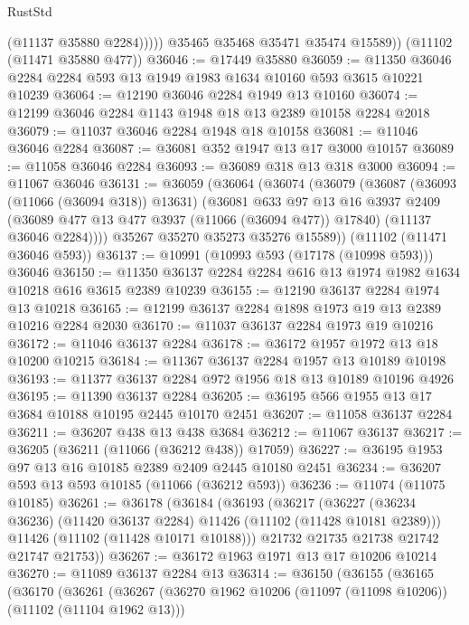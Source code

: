 \begin{lexlean}{RustStd}
\begin{coremodule}
                (@11137 @35880 @2284)))))
        @35465
        @35468
        @35471
        @35474
        @15589))
    (@11102 (@11471 @35880 @477))
@36046 := @17449 @35880
@36059 := @11350 @36046 @2284 @2284 @593 @13 @1949 @1983 @1634 @10160 @593 @3615 @10221 @10239
@36064 := @12190 @36046 @2284 @1949 @13 @10160
@36074 := @12199 @36046 @2284 @1143 @1948 @18 @13 @2389 @10158 @2284 @2018
@36079 := @11037 @36046 @2284 @1948 @18 @10158
@36081 := @11046 @36046 @2284
@36087 := @36081 @352 @1947 @13 @17 @3000 @10157
@36089 := @11058 @36046 @2284
@36093 := @36089 @318 @13 @318 @3000
@36094 := @11067 @36046
@36131 := @36059
    (@36064
      (@36074
        (@36079
          (@36087
            (@36093 (@11066 (@36094 @318)) @13631)
            (@36081
              @633
              @97
              @13
              @16
              @3937
              @2409
              (@36089 @477 @13 @477 @3937 (@11066 (@36094 @477)) @17840)
              (@11137 @36046 @2284))))
        @35267
        @35270
        @35273
        @35276
        @15589))
    (@11102 (@11471 @36046 @593))
@36137 := @10991 (@10993 @593 (@17178 (@10998 @593))) @36046
@36150 := @11350 @36137 @2284 @2284 @616 @13 @1974 @1982 @1634 @10218 @616 @3615 @2389 @10239
@36155 := @12190 @36137 @2284 @1974 @13 @10218
@36165 := @12199 @36137 @2284 @1898 @1973 @19 @13 @2389 @10216 @2284 @2030
@36170 := @11037 @36137 @2284 @1973 @19 @10216
@36172 := @11046 @36137 @2284
@36178 := @36172 @1957 @1972 @13 @18 @10200 @10215
@36184 := @11367 @36137 @2284 @1957 @13 @10189 @10198
@36193 := @11377 @36137 @2284 @972 @1956 @18 @13 @10189 @10196 @4926
@36195 := @11390 @36137 @2284
@36205 := @36195 @566 @1955 @13 @17 @3684 @10188 @10195 @2445 @10170 @2451
@36207 := @11058 @36137 @2284
@36211 := @36207 @438 @13 @438 @3684
@36212 := @11067 @36137
@36217 := @36205 (@36211 (@11066 (@36212 @438)) @17059)
@36227 := @36195 @1953 @97 @13 @16 @10185 @2389 @2409 @2445 @10180 @2451
@36234 := @36207 @593 @13 @593 @10185 (@11066 (@36212 @593))
@36236 := @11074 (@11075 @10185)
@36261 := @36178
    (@36184
      (@36193
        (@36217
          (@36227 (@36234 @36236) (@11420 @36137 @2284) @11426 (@11102 (@11428 @10181 @2389)))
          @11426
          (@11102 (@11428 @10171 @10188)))
        @21732
        @21735
        @21738
        @21742
        @21747
        @21753))
@36267 := @36172 @1963 @1971 @13 @17 @10206 @10214
@36270 := @11089 @36137 @2284 @13
@36314 := @36150
    (@36155
      (@36165
        (@36170
          (@36261
            (@36267
              (@36270 @1962 @10206 (@11097 (@11098 @10206)) (@11102 (@11104 @1962 @13)))

\end{coremodule}
\end{lexlean}
